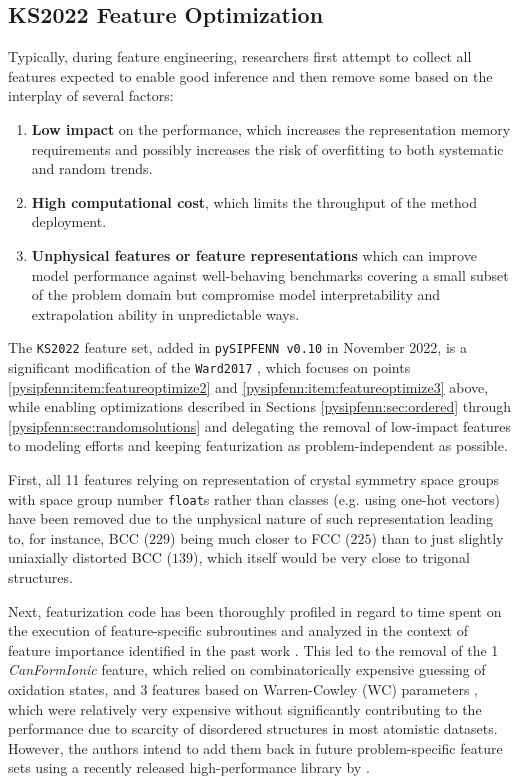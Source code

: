 \subsection{KS2022 Feature Optimization} \label{pysipfenn:ssec:ks2022features}

Typically, during feature engineering, researchers first attempt to collect all features expected to enable good inference and then remove some based on the interplay of several factors:
\begin{enumerate}
    \item \textbf{Low impact} on the performance, which increases the representation memory requirements and possibly increases the risk of overfitting to both systematic and random trends. 
    \label{pysipfenn:item:featureoptimize1}
    \item \textbf{High computational cost}, which limits the throughput of the method deployment.
    \label{pysipfenn:item:featureoptimize2}
    \item \textbf{Unphysical features or feature representations} which can improve model performance against well-behaving benchmarks covering a small subset of the problem domain but compromise model interpretability and extrapolation ability in unpredictable ways.
    \label{pysipfenn:item:featureoptimize3}
\end{enumerate}

The \texttt{KS2022} feature set, added in \texttt{pySIPFENN v0.10} in November 2022, is a significant modification of the \texttt{Ward2017} \cite{Ward2017}, which focuses on points \ref{pysipfenn:item:featureoptimize2} and \ref{pysipfenn:item:featureoptimize3} above, while enabling optimizations described in Sections \ref{pysipfenn:sec:ordered} through \ref{pysipfenn:sec:randomsolutions} and delegating the removal of low-impact features to modeling efforts and keeping featurization as problem-independent as possible.

First, all 11 features relying on representation of crystal symmetry space groups with space group number \texttt{float}s rather than classes (e.g. using one-hot vectors) have been removed due to the unphysical nature of such representation leading to, for instance, BCC ($229$) being much closer to FCC ($225$) than to just slightly uniaxially distorted BCC ($139$), which itself would be very close to trigonal structures. 

Next, featurization code has been thoroughly profiled in regard to time spent on the execution of feature-specific subroutines and analyzed in the context of feature importance identified in the past work \cite{Krajewski2022ExtensibleNetworks}. This led to the removal of the 1 \textit{CanFormIonic} feature, which relied on combinatorically expensive guessing of oxidation states, and 3 features based on Warren-Cowley (WC) parameters \cite{Cowley1950AnAlloys}, which were relatively very expensive without significantly contributing to the performance due to scarcity of disordered structures in most atomistic datasets. However, the authors intend to add them back in future problem-specific feature sets using a recently released high-performance library by \citet{Gehringer2023ModelsSimple}. 

